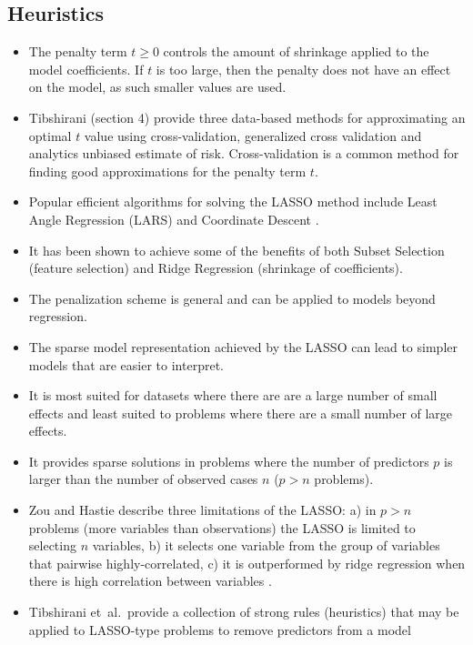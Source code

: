 \subsection{Heuristics}

\begin{itemize}
	\item The penalty term $t \geq 0$ controls the amount of shrinkage applied to the model coefficients. If $t$ is too large, then the penalty does not have an effect on the model, as such smaller values are used.
	\item Tibshirani \cite{Tibshirani1996} (section 4) provide three data-based methods for approximating an optimal $t$ value using cross-validation, generalized cross validation and analytics unbiased estimate of risk. Cross-validation is a common method for finding good approximations for the penalty term $t$.
	\item Popular efficient algorithms for solving the LASSO method include Least Angle Regression (LARS) \cite{Efron2002} and Coordinate Descent \cite{Friedman2007}.
	\item It has been shown to achieve some of the benefits of both Subset Selection (feature selection) and Ridge Regression (shrinkage of coefficients).
	\item The penalization scheme is general and can be applied to models beyond regression.
	\item The sparse model representation achieved by the LASSO can lead to simpler models that are easier to interpret. 
	\item It is most suited for datasets where there are are a large number of small effects and least suited to problems where there are a small number of large effects.
	\item It provides sparse solutions in problems where the number of predictors $p$ is larger than the number of observed cases $n$ ($p>n$ problems).
	\item Zou and Hastie describe three limitations of the LASSO: a) in $p>n$ problems (more variables than observations) the LASSO is limited to selecting $n$ variables, b) it selects one variable from the group of variables that pairwise highly-correlated, c) it is outperformed by ridge regression when there is high correlation between variables \cite{Zou2005}.
	\item Tibshirani et~al.\ provide a collection of strong rules (heuristics) that may be applied to LASSO-type problems to remove predictors from a model \cite{Tibshirani2011}
\end{itemize}

